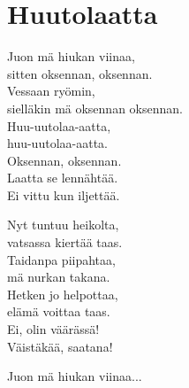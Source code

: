 \section{Huutolaatta}

Juon mä hiukan viinaa,\\
sitten oksennan, oksennan.\\
Vessaan ryömin,\\
sielläkin mä oksennan oksennan.\\
Huu-uutolaa-aatta,\\
huu-uutolaa-aatta.\\
Oksennan, oksennan.\\
Laatta se lennähtää.\\
Ei vittu kun iljettää.

Nyt tuntuu heikolta,\\
vatsassa kiertää taas.\\
Taidanpa piipahtaa,\\
mä nurkan takana.\\
Hetken jo helpottaa,\\
elämä voittaa taas.\\
Ei, olin väärässä!\\
Väistäkää, saatana!

Juon mä hiukan viinaa...